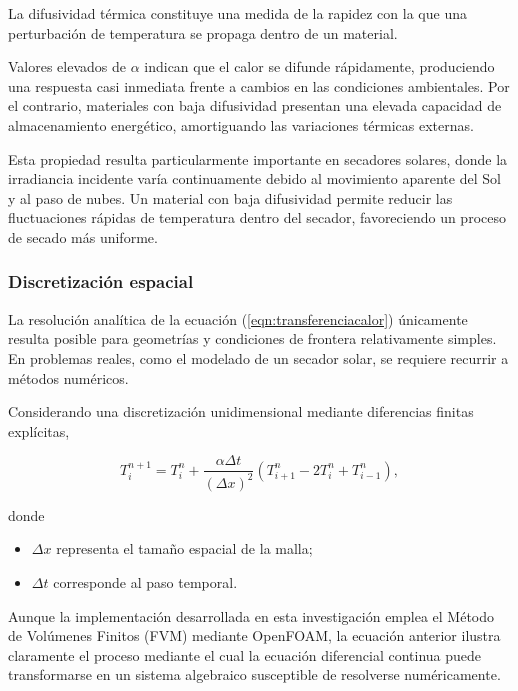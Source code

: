 La difusividad térmica constituye una medida de la rapidez con la que una perturbación de temperatura se propaga dentro de un material.

Valores elevados de $\alpha$ indican que el calor se difunde rápidamente, produciendo una respuesta casi inmediata frente a cambios en las condiciones ambientales. Por el contrario, materiales con baja difusividad presentan una elevada capacidad de almacenamiento energético, amortiguando las variaciones térmicas externas.

Esta propiedad resulta particularmente importante en secadores solares, donde la irradiancia incidente varía continuamente debido al movimiento aparente del Sol y al paso de nubes. Un material con baja difusividad permite reducir las fluctuaciones rápidas de temperatura dentro del secador, favoreciendo un proceso de secado más uniforme.

\subsubsection{Discretización espacial}

La resolución analítica de la ecuación (\ref{eqn:transferenciacalor}) únicamente resulta posible para geometrías y condiciones de frontera relativamente simples. En problemas reales, como el modelado de un secador solar, se requiere recurrir a métodos numéricos.

Considerando una discretización unidimensional mediante diferencias finitas explícitas,

\begin{equation}
T_i^{n+1}
=
T_i^n
+
\frac{\alpha\Delta t}{(\Delta x)^2}
\left(
T_{i+1}^n
-
2T_i^n
+
T_{i-1}^n
\right),
\end{equation}

donde

\begin{itemize}

\item $\Delta x$ representa el tamaño espacial de la malla;

\item $\Delta t$ corresponde al paso temporal.

\end{itemize}

Aunque la implementación desarrollada en esta investigación emplea el Método de Volúmenes Finitos (FVM) mediante OpenFOAM, la ecuación anterior ilustra claramente el proceso mediante el cual la ecuación diferencial continua puede transformarse en un sistema algebraico susceptible de resolverse numéricamente.

